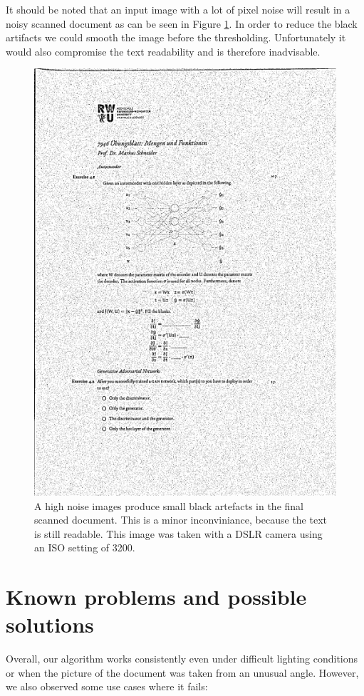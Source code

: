 \documentclass[bibliography=totoc]{scrartcl}
\begin{document}
It should be noted that an input image with a lot of pixel noise will result in a noisy scanned document as can be seen in Figure \ref{fig:noise}.
In order to reduce the black artifacts we could smooth the image before the thresholding.
Unfortunately it would also compromise the text readability and is therefore inadvisable. \\

\begin{figure}[h!]
	\centering
	\includegraphics[width=0.3\linewidth]{imgs/threshold/noise.jpg}
	\caption{A high noise images produce small black artefacts in the final scanned document. This is a minor inconviniance, because the text is still readable. This image was taken with a \acs{DSLR} camera using an ISO setting of 3200.}
	\label{fig:noise}
\end{figure}

\section{Known problems and possible solutions}

Overall, our algorithm works consistently even under difficult lighting conditions or when the picture of the document was taken from an unusual angle.
However, we also observed some use cases where it fails:\\
\end{document}
